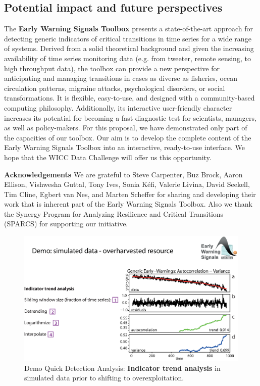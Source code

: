 \documentclass[12pt,a4paper,final]{article}
\begin{document}
\begin{doublespacing}
\section{Potential impact and future perspectives}
The \textbf{Early Warning Signals Toolbox} presents a state-of-the-art approach for detecting generic indicators of critical transitions in time series for a wide range of systems. Derived from a solid theoretical background and given the increasing availability of time series monitoring data (e.g. from tweeter, remote sensing, to high throughput data), the toolbox can provide a new perspective for anticipating and managing transitions in cases as diverse as fisheries, ocean circulation patterns, migraine attacks, psychological disorders, or social transformations. It is flexible, easy-to-use, and designed with a community-based computing philosophy. Additionally, its interactive user-friendly character increases its potential for becoming a fast diagnostic test for scientists, managers, as well as policy-makers. For this proposal, we have demonstrated only part of the capacities of our toolbox. Our aim is to develop the complete content of the Early Warning Signals Toolbox into an interactive, ready-to-use interface. We hope that the WICC Data Challenge will offer us this opportunity.\\

\end{doublespacing}
\newpage
{\small
\textbf{Acknowledgements}
We are grateful to Steve Carpenter, Buz Brock, Aaron Ellison, Vishwesha Guttal, Tony Ives, Sonia K\'{e}fi, Valerie Livina, David Seekell, Tim Cline, Egbert van Nes, and Marten Scheffer for sharing and developing their work that is inherent part of the Early Warning Signals Toolbox. Also we thank the Synergy Program for Analyzing Resilience and Critical Transitions  (SPARCS) for supporting our initiative.



}

\newpage
\begin{figure}[ht]
\begin{center}
\includegraphics[scale=0.8]{fig_3_simulated_generic.eps}
\caption{Demo Quick Detection Analysis: \textbf{Indicator trend analysis} in simulated data prior to shifting to overexploitation.}
\end{center}
\label{fig:simulated_generic}
\end{figure} 
\end{document}
